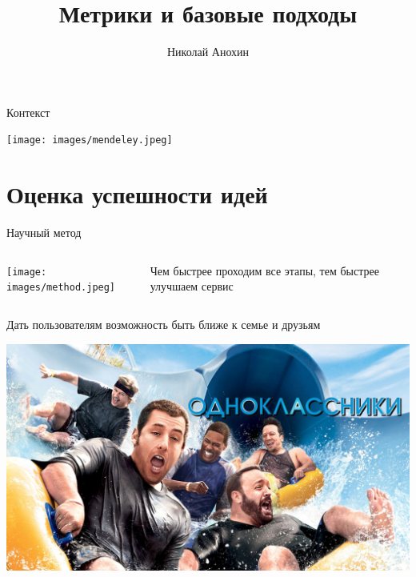 \documentclass[11pt,aspectratio=169,handout]{beamer}
\author{Николай Анохин}
\title{Метрики и базовые подходы}
\begin{document}
{

\begin{frame}
\titlepage
\end{frame}

}

\begin{frame}{Контекст}

\begin{center}
\texttt{[image: images/mendeley.jpeg]}
\end{center}

\end{frame}

\section{Оценка успешности идей}

\begin{frame}{Научный метод}

\begin{columns}
\begin{column}{0.45\textwidth}   
   \begin{center}
      \texttt{[image: images/method.jpeg]}
    \end{center}
\end{column}
\begin{column}{0.45\textwidth}
    \begin{tcolorbox}[colback=gray!5,colframe=gray!80,title=]
       Чем быстрее проходим все этапы, тем быстрее улучшаем сервис
    \end{tcolorbox}
\end{column}
\end{columns}

\end{frame}

\begin{frame}{}

\begin{tcolorbox}[colback=gray!5,colframe=gray!80,title=Миссия компании]
Дать пользователям возможность быть ближе к семье и друзьям
\end{tcolorbox}

\begin{center}
\includegraphics[scale=0.14]{images/odnoklassniki.jpeg}
\end{center}

\end{frame}
\end{document}
